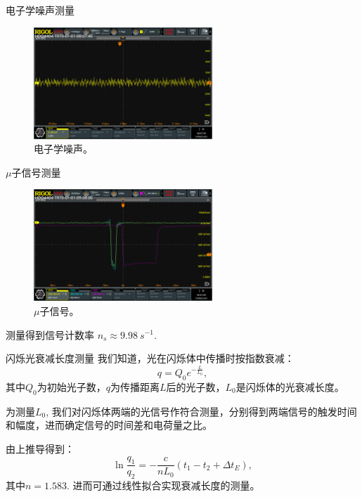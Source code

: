 \documentclass[10pt]{beamer}
\begin{document}
\begin{frame}[label={sec:org7d2cd88}]{电子学噪声测量}
\begin{figure}[htbp]
\centering
\includegraphics[width=0.6\textwidth]{../ExperimentData/figs/elenoise0.png}
\caption{电子学噪声。}
\end{figure}
\end{frame}
\begin{frame}[label={sec:org9e0e478}]{\(\mu\)子信号测量}
\begin{figure}[htbp]
\centering
\includegraphics[width=0.6\textwidth]{../ExperimentData/figs/musignal0.png}
\caption{\(\mu\)子信号。}
\end{figure}

测量得到信号计数率 \(n_s \approx \qty{9.98}{s^{-1}}\).
\end{frame}
\begin{frame}[label={sec:org830efa8}]{闪烁光衰减长度测量}
我们知道，光在闪烁体中传播时按指数衰减：
\begin{equation}
\label{eq:1}
q = Q_0 e^{-\frac{L}{L_0}},
\end{equation}
其中\(Q_0\)为初始光子数，\(q\)为传播距离\(L\)后的光子数，\(L_0\)是闪烁体的光衰减长度。

为测量\(L_0\), 我们对闪烁体两端的光信号作符合测量，分别得到两端信号的触发时间和幅度，进而确定信号的时间差和电荷量之比。

由上推导得到：
\begin{equation}
\label{eq:2}
\ln \frac{q_1}{q_2} = -\frac{c}{nL_0}(t_1 - t_2+\Delta t_E),
\end{equation}
其中\(n=1.583\). 进而可通过线性拟合实现衰减长度的测量。
\end{frame}
\end{document}
